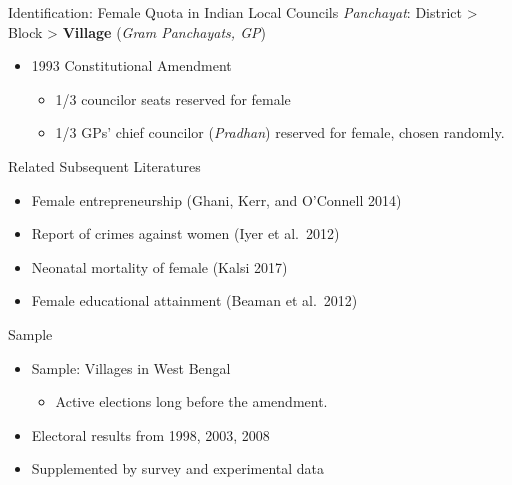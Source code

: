 \documentclass[
  10pt,
  ignorenonframetext,
  aspectratio=43,
]{beamer}
\providecommand{\tightlist}{%
  \setlength{\itemsep}{0pt}\setlength{\parskip}{0pt}}
\begin{document}
\begin{frame}{Identification: Female Quota in Indian Local Councils}
\protect\hypertarget{identification-female-quota-in-indian-local-councils}{}
\emph{Panchayat}: District \textgreater{} Block \textgreater{}
\textbf{Village} (\emph{Gram Panchayats, GP})

\begin{itemize}
\tightlist
\item
  1993 Constitutional Amendment

  \begin{itemize}
  \tightlist
  \item
    1/3 councilor seats reserved for female
  \item
    1/3 GPs' chief councilor (\emph{Pradhan}) reserved for female,
    chosen randomly.
  \end{itemize}
\end{itemize}

\begin{block}{Related Subsequent Literatures}
\protect\hypertarget{related-subsequent-literatures}{}
\begin{itemize}
\tightlist
\item
  Female entrepreneurship \footnotesize (Ghani, Kerr, and O'Connell
  2014) \normalsize
\item
  Report of crimes against women \footnotesize (Iyer et al.~2012)
  \normalsize
\item
  Neonatal mortality of female \footnotesize (Kalsi 2017) \normalsize
\item
  Female educational attainment \footnotesize (Beaman et al.~2012)
  \normalsize
\end{itemize}
\end{block}
\end{frame}

\begin{frame}{Sample}
\protect\hypertarget{sample}{}
\begin{itemize}
\tightlist
\item
  Sample: Villages in West Bengal

  \begin{itemize}
  \tightlist
  \item
    Active elections long before the amendment.
  \end{itemize}
\item
  Electoral results from 1998, 2003, 2008
\item
  Supplemented by survey and experimental data
\end{itemize}
\end{frame}
\end{document}
